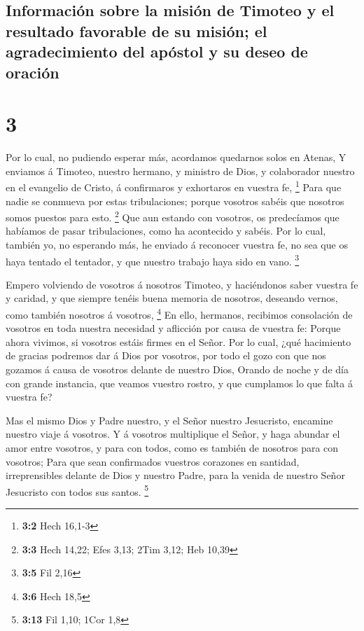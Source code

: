 \hypertarget{informaciuxf3n-sobre-la-misiuxf3n-de-timoteo-y-el-resultado-favorable-de-su-misiuxf3n-el-agradecimiento-del-apuxf3stol-y-su-deseo-de-oraciuxf3n}{%
\subsection{Información sobre la misión de Timoteo y el resultado
favorable de su misión; el agradecimiento del apóstol y su deseo de
oración}\label{informaciuxf3n-sobre-la-misiuxf3n-de-timoteo-y-el-resultado-favorable-de-su-misiuxf3n-el-agradecimiento-del-apuxf3stol-y-su-deseo-de-oraciuxf3n}}

\hypertarget{section-2}{%
\section{3}\label{section-2}}

 Por lo cual, no pudiendo esperar más, acordamos quedarnos
solos en Atenas,  Y enviamos á Timoteo, nuestro hermano, y
ministro de Dios, y colaborador nuestro en el evangelio de Cristo, á
confirmaros y exhortaros en vuestra fe, \footnote{\textbf{3:2} Hech
  16,1-3}  Para que nadie se conmueva por estas
tribulaciones; porque vosotros sabéis que nosotros somos puestos para
esto. \footnote{\textbf{3:3} Hech 14,22; Efes 3,13; 2Tim 3,12; Heb 10,39}
 Que aun estando con vosotros, os predecíamos que habíamos
de pasar tribulaciones, como ha acontecido y sabéis.  Por
lo cual, también yo, no esperando más, he enviado á reconocer vuestra
fe, no sea que os haya tentado el tentador, y que nuestro trabajo haya
sido en vano. \footnote{\textbf{3:5} Fil 2,16}

 Empero volviendo de vosotros á nosotros Timoteo, y
haciéndonos saber vuestra fe y caridad, y que siempre tenéis buena
memoria de nosotros, deseando vernos, como también nosotros á vosotros,
\footnote{\textbf{3:6} Hech 18,5}  En ello, hermanos,
recibimos consolación de vosotros en toda nuestra necesidad y aflicción
por causa de vuestra fe:  Porque ahora vivimos, si
vosotros estáis firmes en el Señor.  Por lo cual, ¿qué
hacimiento de gracias podremos dar á Dios por vosotros, por todo el gozo
con que nos gozamos á causa de vosotros delante de nuestro Dios,
 Orando de noche y de día con grande instancia, que
veamos vuestro rostro, y que cumplamos lo que falta á vuestra fe?

 Mas el mismo Dios y Padre nuestro, y el Señor nuestro
Jesucristo, encamine nuestro viaje á vosotros.  Y á
vosotros multiplique el Señor, y haga abundar el amor entre vosotros, y
para con todos, como es también de nosotros para con vosotros;
 Para que sean confirmados vuestros corazones en
santidad, irreprensibles delante de Dios y nuestro Padre, para la venida
de nuestro Señor Jesucristo con todos sus santos. \footnote{\textbf{3:13}
  Fil 1,10; 1Cor 1,8}

